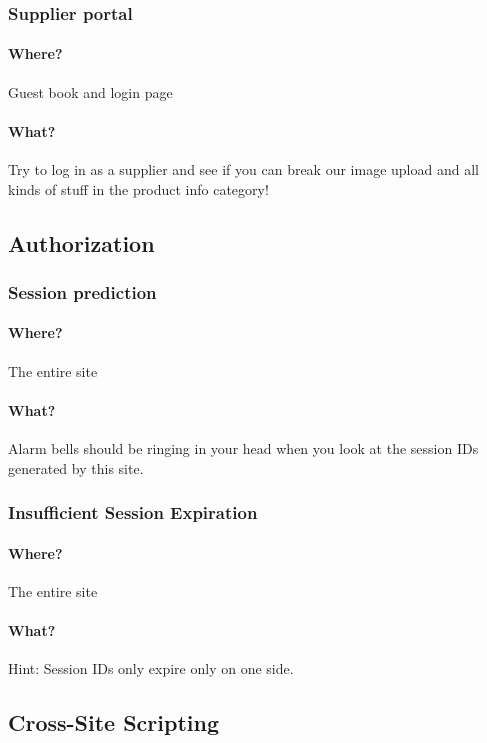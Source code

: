 \documentclass[12pt,a4paper]{article}
\begin{document}
\subsubsection{Supplier portal}
\paragraph{Where?}
Guest book and login page

\paragraph{What?}
Try to log in as a supplier and see if you can break our image upload and all kinds of stuff in the product info category!

\subsection{Authorization}
\subsubsection{Session prediction}
\paragraph{Where?}
The entire site

\paragraph{What?}
Alarm bells should be ringing in your head when you look at the session IDs generated by this site.

\subsubsection{Insufficient Session Expiration}
\paragraph{Where?}
The entire site

\paragraph{What?}
Hint: Session IDs only expire only on one side.

\subsection{Cross-Site Scripting}
\end{document}
